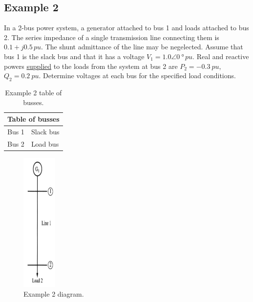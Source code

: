 \subsection{Example 2}
In a 2-bus power system, a generator attached to bus 1 and loads attached to bus 2. The series impedance of a single transmission line connecting them is $0.1 +j0.5\, \si{pu}$. The shunt admittance of the line may be negelected. Assume that bus 1 is the slack bus and that it has a voltage $V_1 = 1.0\angle\SI{0}{\degree}\,\si{pu}$. Real and reactive powers \underline{supplied} to the loads from the system at bus 2 are $P_2 = \SI{-0.3}{pu}$, $Q_2 = \SI{0.2}{pu}$. Determine voltages at each bus for the specified load conditions.
\begin{table}[H]
	\centering
	\begin{tabular}{@{}ll@{}}
		\toprule
		\multicolumn{2}{l}{\textbf{Table of busses}}\\
		\midrule
		Bus 1 & Slack bus\\
		Bus 2 & Load bus\\
		\bottomrule
	\end{tabular}
	\caption{Example 2 table of busses.}
\end{table}
\begin{figure}[H]
	\centering
	\includegraphics[height = 7cm]{img/figure51.png}
	\caption{Example 2 diagram.}
\end{figure}
